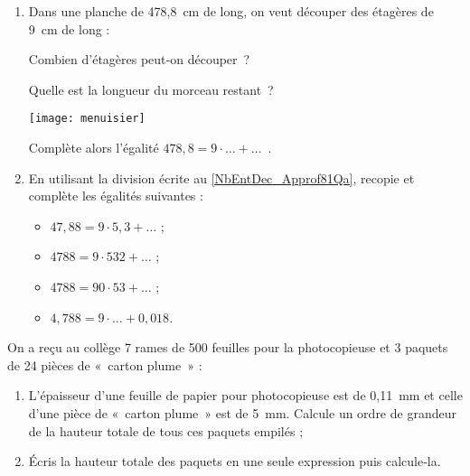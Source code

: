 \begin{exercice}
\begin{enumerate}
 \item Dans une planche de 478,8 cm de long, on veut découper des étagères de 9 cm de long :
 
Combien d'étagères peut‑on découper ? 

Quelle est la longueur du morceau restant ? 

\begin{center} \texttt{[image: menuisier]} \end{center}

Complète alors l'égalité $478,8 = 9 \cdot \ldots + \ldots$ . \label{NbEntDec_Approf81Qa}

 \item En utilisant la division écrite au \ref{NbEntDec_Approf81Qa}, recopie et complète les égalités suivantes :
 \begin{itemize}  
  \item $47,88 = 9 \cdot 5,3 + \ldots$ ;
  \item $4 788 = 9 \cdot 532 + \ldots$ ;
  \item $4 788 = 90 \cdot 53 + \ldots$ ;
  \item $4,788 = 9 \cdot \ldots + 0,018$.
  \end{itemize}
 \end{enumerate}
\end{exercice}


\begin{exercice}
On a reçu au collège 7 rames de 500 feuilles pour la photocopieuse et 3 paquets de 24 pièces de « carton plume » :
\begin{enumerate}
 \item L'épaisseur d'une feuille de papier pour photocopieuse est de 0,11 mm et celle d'une pièce de « carton plume » est de 5 mm. Calcule un ordre de grandeur de la hauteur totale de tous ces paquets empilés ;
 \item Écris la hauteur totale des paquets en une seule expression puis calcule‑la.
 \end{enumerate}
\end{exercice}


